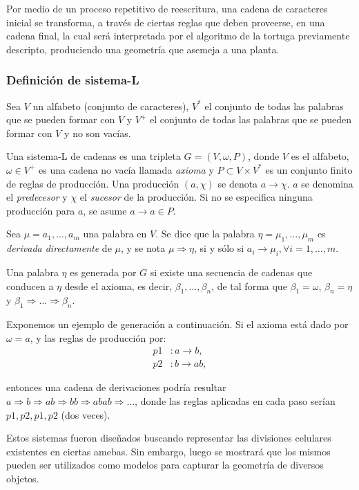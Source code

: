 Por medio de un proceso repetitivo de reescritura, una cadena de caracteres inicial se transforma, a través de ciertas reglas que deben proveerse, en una cadena final, la cual será interpretada por el algoritmo de la tortuga previamente descripto, produciendo una geometría que asemeja a una planta.

\subsubsection{Definición de sistema-L}
Sea $V$ un alfabeto (conjunto de caracteres), $V^{*}$ el conjunto de todas las palabras que se pueden formar con $V$ y $V^{+}$ el conjunto de todas las palabras que se pueden formar con $V$ y no son vacías.

Una sistema-L de cadenas es una tripleta $G = (V,\omega,P)$, donde $V$ es el alfabeto, $\omega \in V^{+}$ es una cadena no vacía llamada {\em axioma} y $P \subset V \times V^{*}$ es un conjunto finito de reglas de producción.
Una producción $(a,\chi)$ se denota $a \rightarrow \chi$.
$a$ se denomina el {\em predecesor} y $\chi$ el {\em sucesor} de la producción.
Si no se especifica ninguna producción para $a$, se asume $a \rightarrow a \in P$.

Sea $\mu = a_{1}, \dots, a_{m}$ una palabra en $V$.
Se dice que la palabra $\eta = \mu_{1}, \dots, \mu_{m}$ es {\em derivada directamente} de $\mu$, y se nota $\mu \Rightarrow \eta$,  si y sólo si $a_{i} \rightarrow \mu_{i}, \forall i = 1, \dots, m$.

Una palabra $\eta$ es generada por $G$ si existe una secuencia de cadenas que conducen a $\eta$ desde el axioma, es decir, $\beta_{1},\dots,\beta_{n}$, de tal forma que $\beta_{1} = \omega$, $\beta_{n} = \eta$ y $\beta_{1} \Rightarrow \dots  \Rightarrow \beta_{n}$.

Exponemos un ejemplo de generación a continuación.
Si el axioma está dado por $\omega = a$, y las reglas de producción por:
\begin{align*}
p1 &: a \rightarrow b,\\
p2 &: b \rightarrow ab,
\end{align*}

entonces una cadena de derivaciones podría resultar $a \Rightarrow b \Rightarrow ab \Rightarrow bb \Rightarrow abab \Rightarrow \dots$, donde las reglas aplicadas en cada paso serían $p1, p2, p1, p2$ (dos veces).

Estos sistemas fueron diseñados buscando representar las divisiones celulares existentes en ciertas amebas.
Sin embargo, luego se mostrará que los mismos pueden ser utilizados como modelos para capturar la geometría de diversos objetos.

